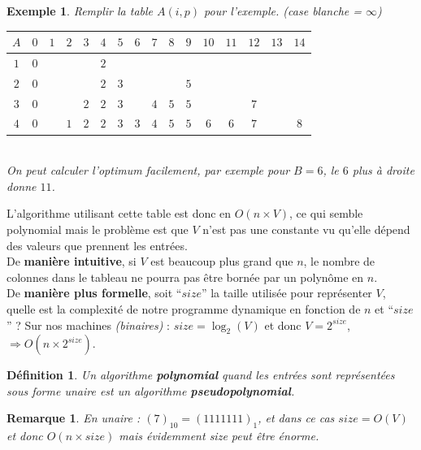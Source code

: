 \documentclass[12pt]{article}
\newtheorem{de}{D\'efinition}[section]
\newtheorem{exemple}{Exemple}[section]
\newtheorem{rem}{Remarque}[section]
\begin{document}
\begin{exemple}
Remplir la table $A(i,p)$ pour l'exemple. \textit{(case blanche = $\infty$)} \\

\begin{tabular}{c|ccccccccccccccc}
$A$ & $0$ & $1$ & $2$ & $3$ & $4$ & $5$ & $6$ & $7$ & $8$ & $9$ & $10$ & $11$ & $12$ & $13$ & $14$ \\
\hline
$1$ & $0$ &   &   &   & $2$ &   &   &   &   &   &    &    &    &    &    \\
$2$ & $0$ &   &   &   & $2$ & $3$ &   &   &   & $5$ &    &    &    &    &    \\
$3$ & $0$ &   &   & $2$ & $2$ & $3$ &   & $4$ & $5$ & $5$ &    &    &  $7$ &    &    \\
$4$ & $0$ &   & $1$ & $2$ & $2$ & $3$ & $3$ & $4$ & $5$ & $5$ &  $6$ &  $6$ &  $7$ &    &  $8$ \\
\end{tabular}
$ $\\

\noindent On peut calculer l'optimum facilement, par exemple pour $B = 6$, le $6$ plus à droite donne $11$.
\end{exemple}

L'algorithme utilisant cette table est donc en $O(n\times V)$, ce qui semble polynomial mais le problème est que $V$ n'est pas une
constante vu qu'elle dépend des valeurs que prennent les entrées. \\
De \textbf{manière intuitive}, si $V$ est beaucoup plus grand que $n$, le nombre de colonnes dans le tableau ne pourra pas être bornée par
un polynôme en $n$. \\
De \textbf{manière plus formelle}, soit ``$size$'' la taille utilisée pour représenter $V$, quelle est la complexité de notre programme
dynamique en fonction de $n$ et ``$size$'' ? Sur nos machines \textit{(binaires)} : $size = \log_2{(V)}$ et donc $V = 2^{size}$,
$\Rightarrow O(n \times 2^{size})$. \\

\begin{de}
Un algorithme \textbf{polynomial} quand les entrées sont représentées sous forme unaire est un algorithme \textbf{pseudopolynomial}.
\end{de}

\begin{rem}
En unaire : $(7)_{10} = (1111111)_1$, et dans ce cas $size = O(V)$ et donc $O(n\times size)$ mais évidemment size peut être énorme.
\end{rem}
\end{document}
